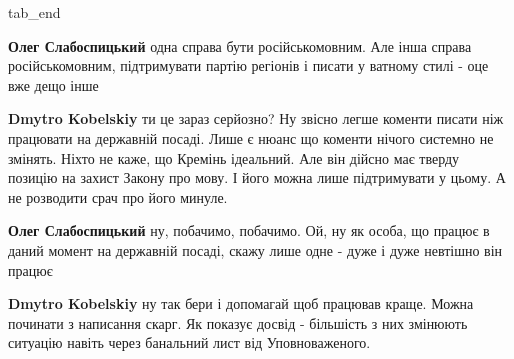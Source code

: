 \begin{itemize}
tab_end
\fi

\textbf{Олег Слабоспицький} одна справа бути російськомовним. Але інша справа російськомовним, підтримувати партію регіонів і писати у ватному стилі - оце вже дещо інше

\textbf{Dmytro Kobelskiy} ти це зараз серйозно? Ну звісно легше коменти писати ніж працювати на державній посаді. Лише є нюанс що коменти нічого системно не змінять.
Ніхто не каже, що Кремінь ідеальний. Але він дійсно має тверду позицію на захист Закону про мову. І його можна лише підтримувати у цьому. А не розводити срач про його минуле.

\textbf{Олег Слабоспицький} ну, побачимо, побачимо. Ой, ну як особа, що працює в даний момент на державній посаді, скажу лише одне - дуже і дуже невтішно він працює

\textbf{Dmytro Kobelskiy} ну так бери і допомагай щоб працював краще. Можна починати з написання скарг. Як показує досвід - більшість з них змінюють ситуацію навіть через банальний лист від Уповноваженого.




\end{itemize} %
